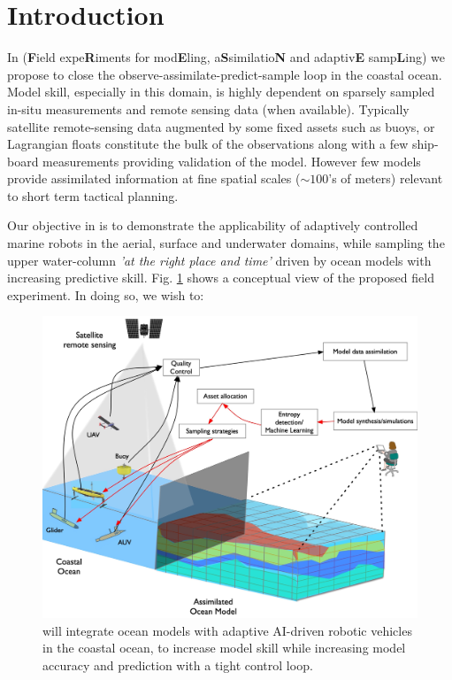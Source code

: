 \section{Introduction}





In \proj (\textbf{F}ield expe\textbf{R}iments for mod\textbf{E}ling,
a\textbf{S}similatio\textbf{N} and adaptiv\textbf{E}
samp\textbf{L}ing) we propose to close the
observe-assimilate-predict-sample loop in the coastal ocean. Model
skill, especially in this domain, is highly dependent on sparsely
sampled in-situ measurements and remote sensing data (when
available). Typically satellite remote-sensing data augmented by some
fixed assets such as buoys, or Lagrangian floats constitute the bulk
of the observations along with a few ship-board measurements providing
validation of the model. However few models provide assimilated
information at fine spatial scales ($\sim 100$'s of meters) relevant
to short term tactical planning.

Our objective in \proj is to demonstrate the applicability of
adaptively controlled marine robots in the aerial, surface and
underwater domains, while sampling the upper water-column \emph{'at
  the right place and time'} driven by ocean models with increasing
predictive skill. Fig. \ref{fig:block-diag} shows a conceptual view of
the proposed field experiment. In doing so, we wish to:

\begin{figure}[!b]
  \centering
  \includegraphics[scale=0.15]{fig/ensemble.jpg}
  \caption{\proj will integrate ocean models with adaptive AI-driven
    robotic vehicles in the coastal ocean, to increase model skill
    while increasing model accuracy and prediction with a tight
    control loop.}
  \label{fig:block-diag}
\end{figure}

